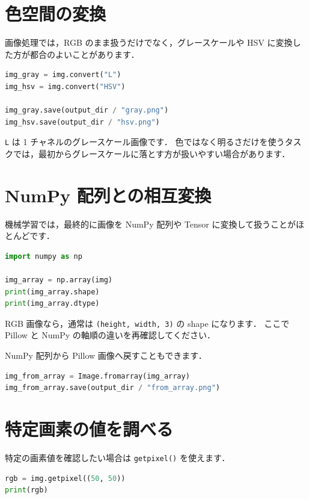 \section{色空間の変換}

画像処理では，RGB のまま扱うだけでなく，グレースケールや HSV に変換した方が都合のよいことがあります．

\begin{lstlisting}[style=codecell,language=Python]
img_gray = img.convert("L")
img_hsv = img.convert("HSV")

img_gray.save(output_dir / "gray.png")
img_hsv.save(output_dir / "hsv.png")
\end{lstlisting}

\texttt{L} は 1 チャネルのグレースケール画像です．
色ではなく明るさだけを使うタスクでは，最初からグレースケールに落とす方が扱いやすい場合があります．


\section{NumPy 配列との相互変換}

機械学習では，最終的に画像を NumPy 配列や Tensor に変換して扱うことがほとんどです．

\begin{lstlisting}[style=codecell,language=Python]
import numpy as np

img_array = np.array(img)
print(img_array.shape)
print(img_array.dtype)
\end{lstlisting}

RGB 画像なら，通常は \texttt{(height, width, 3)} の shape になります．
ここで Pillow と NumPy の軸順の違いを再確認してください．

NumPy 配列から Pillow 画像へ戻すこともできます．

\begin{lstlisting}[style=codecell,language=Python]
img_from_array = Image.fromarray(img_array)
img_from_array.save(output_dir / "from_array.png")
\end{lstlisting}


\section{特定画素の値を調べる}

特定の画素値を確認したい場合は \texttt{getpixel()} を使えます．

\begin{lstlisting}[style=codecell,language=Python]
rgb = img.getpixel((50, 50))
print(rgb)
\end{lstlisting}

